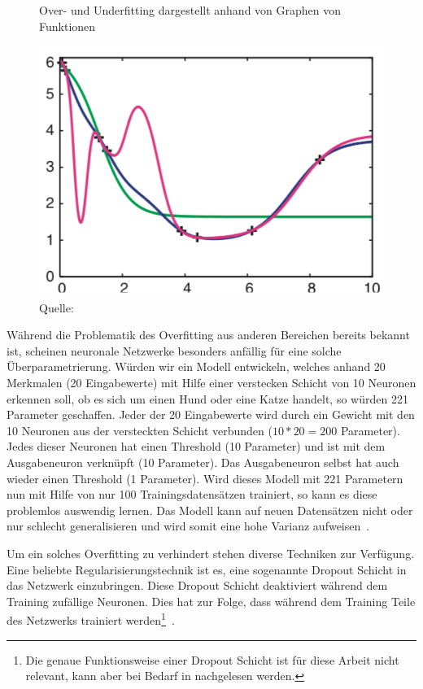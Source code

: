 \begin{figure}[h!]
    \captionsetup{width=.9\linewidth}
    \caption{Over- und Underfitting dargestellt anhand von Graphen von Funktionen}
    \label{krogh:d}
    \centering
    \includegraphics[width=0.6\linewidth]{graphics/krogh/krogh_overfitting.png}
    \caption*{Quelle: \textcite{Krogh2008}}
\end{figure}

Während die Problematik des Overfitting aus anderen Bereichen bereits bekannt ist, scheinen neuronale Netzwerke besonders anfällig für eine solche Überparametrierung. Würden wir ein Modell entwickeln, welches anhand 20 Merkmalen (20 Eingabewerte) mit Hilfe einer verstecken Schicht von 10 Neuronen erkennen soll, ob es sich um einen Hund oder eine Katze handelt, so würden 221 Parameter geschaffen. Jeder der 20 Eingabewerte wird durch ein Gewicht mit den 10 Neuronen aus der versteckten Schicht verbunden ($10 * 20 = 200$ Parameter). Jedes dieser Neuronen hat einen Threshold (10 Parameter) und ist mit dem Ausgabeneuron verknüpft (10 Parameter). Das Ausgabeneuron selbst hat auch wieder einen Threshold (1 Parameter). Wird dieses Modell mit 221 Parametern nun mit Hilfe von nur 100 Trainingsdatensätzen trainiert, so kann es diese problemlos auswendig lernen. Das Modell kann auf neuen Datensätzen nicht oder nur schlecht generalisieren und wird somit eine hohe Varianz aufweisen~\autocite{Krogh2008}.

Um ein solches Overfitting zu verhindert stehen diverse Techniken zur Verfügung. Eine beliebte Regularisierungstechnik ist es, eine sogenannte Dropout Schicht in das Netzwerk einzubringen. Diese Dropout Schicht deaktiviert während dem Training zufällige Neuronen. Dies hat zur Folge, dass während dem Training Teile des Netzwerks trainiert werden\footnote{Die genaue Funktionsweise einer Dropout Schicht ist für diese Arbeit nicht relevant, kann aber bei Bedarf in \textcite{Goodfellow2016} nachgelesen werden.}~\autocite{Goodfellow2016}.


